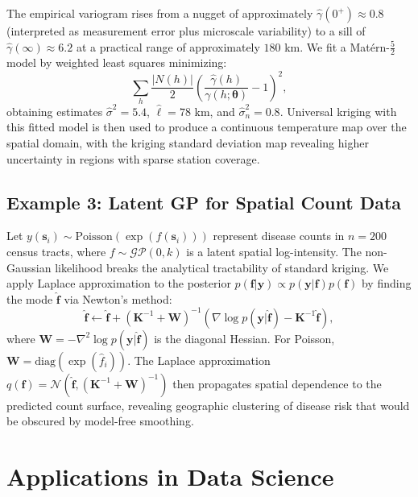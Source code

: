 \documentclass[conference]{IEEEtran}
\begin{document}
The empirical variogram rises from a nugget of approximately $\hat{\gamma}(0^+) \approx 0.8$ (interpreted as measurement error plus microscale variability) to a sill of $\hat{\gamma}(\infty) \approx 6.2$ at a practical range of approximately $180$ km. We fit a Mat\'{e}rn-$\tfrac{5}{2}$ model by weighted least squares minimizing:
\begin{equation}
  \sum_h \frac{|N(h)|}{2}\left(\frac{\hat{\gamma}(h)}{\gamma(h;\bm{\theta})} - 1\right)^2,
  \label{eq:wls_vario}
\end{equation}
obtaining estimates $\hat{\sigma}^2 = 5.4$, $\hat{\ell} = 78$ km, and $\hat{\sigma}_n^2 = 0.8$. Universal kriging with this fitted model is then used to produce a continuous temperature map over the spatial domain, with the kriging standard deviation map revealing higher uncertainty in regions with sparse station coverage.

\subsection{Example 3: Latent GP for Spatial Count Data}

Let $y(\mathbf{s}_i) \sim \text{Poisson}(\exp(f(\mathbf{s}_i)))$ represent disease counts in $n = 200$ census tracts, where $f \sim \mathcal{GP}(0, k)$ is a latent spatial log-intensity. The non-Gaussian likelihood breaks the analytical tractability of standard kriging. We apply Laplace approximation to the posterior $p(\mathbf{f}|\mathbf{y}) \propto p(\mathbf{y}|\mathbf{f})p(\mathbf{f})$ by finding the mode $\hat{\mathbf{f}}$ via Newton's method:
\begin{equation}
  \hat{\mathbf{f}} \leftarrow \hat{\mathbf{f}} + (\mathbf{K}^{-1} + \mathbf{W})^{-1}(\nabla \log p(\mathbf{y}|\hat{\mathbf{f}}) - \mathbf{K}^{-1}\hat{\mathbf{f}}),
  \label{eq:newton_laplace}
\end{equation}
where $\mathbf{W} = -\nabla^2 \log p(\mathbf{y}|\hat{\mathbf{f}})$ is the diagonal Hessian. For Poisson, $\mathbf{W} = \text{diag}(\exp(\hat{f}_i))$. The Laplace approximation $q(\mathbf{f}) = \mathcal{N}(\hat{\mathbf{f}}, (\mathbf{K}^{-1} + \mathbf{W})^{-1})$ then propagates spatial dependence to the predicted count surface, revealing geographic clustering of disease risk that would be obscured by model-free smoothing.

\section{Applications in Data Science}
\label{sec:applications}
\end{document}
